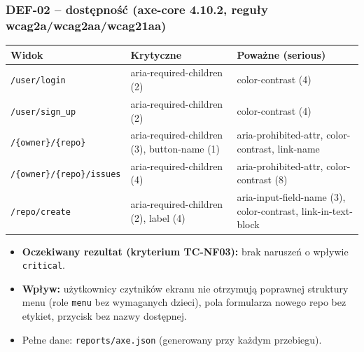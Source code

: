 \subsubsection{DEF-02 – dostępność (axe-core 4.10.2, reguły wcag2a/wcag2aa/wcag21aa)}
{\small
\par\smallskip\noindent\begin{tabular}{>{\raggedright\arraybackslash}p{}>{\raggedright\arraybackslash}p{}>{\raggedright\arraybackslash}p{}}
\toprule
\textbf{Widok} & \textbf{Krytyczne} & \textbf{Poważne (serious)} \\
\midrule
\texttt{/\allowbreak{}user/\allowbreak{}login} & aria-required-children (2) & color-contrast (4) \\
\texttt{/\allowbreak{}user/\allowbreak{}sign\_\allowbreak{}up} & aria-required-children (2) & color-contrast (4) \\
\texttt{/\allowbreak{}\{owner\}/\allowbreak{}\{repo\}} & aria-required-children (3), button-name (1) & aria-prohibited-attr, color-contrast, link-name \\
\texttt{/\allowbreak{}\{owner\}/\allowbreak{}\{repo\}/\allowbreak{}issues} & aria-required-children (4) & aria-prohibited-attr, color-contrast (8) \\
\texttt{/\allowbreak{}repo/\allowbreak{}create} & aria-required-children (2), label (4) & aria-input-field-name (3), color-contrast, link-in-text-block \\
\bottomrule
\end{tabular}\par\smallskip
}
\begin{itemize}
\item \textbf{Oczekiwany rezultat (kryterium TC-NF03):} brak naruszeń o wpływie \texttt{critical}.
\item \textbf{Wpływ:} użytkownicy czytników ekranu nie otrzymują poprawnej struktury menu (role \texttt{menu} bez wymaganych dzieci), pola formularza nowego repo bez etykiet, przycisk bez nazwy dostępnej.
\item Pełne dane: \texttt{reports/\allowbreak{}axe.json} (generowany przy każdym przebiegu).
\end{itemize}

